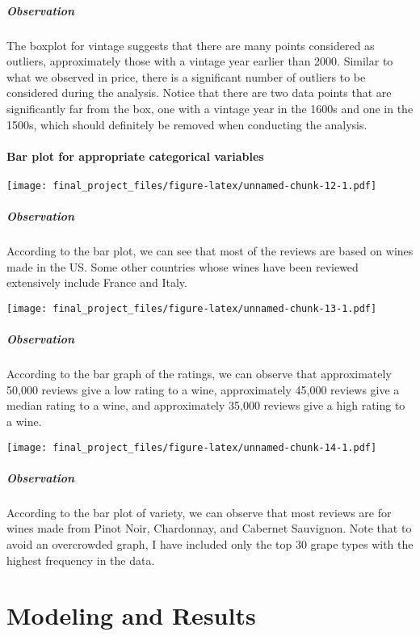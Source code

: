 \documentclass[
]{article}
\begin{document}
\hypertarget{observation-5}{%
\subparagraph{Observation}\label{observation-5}}

The boxplot for vintage suggests that there are many points considered
as outliers, approximately those with a vintage year earlier than 2000.
Similar to what we observed in price, there is a significant number of
outliers to be considered during the analysis. Notice that there are two
data points that are significantly far from the box, one with a vintage
year in the 1600s and one in the 1500s, which should definitely be
removed when conducting the analysis.

\hypertarget{bar-plot-for-appropriate-categorical-variables}{%
\paragraph{Bar plot for appropriate categorical
variables}\label{bar-plot-for-appropriate-categorical-variables}}

\texttt{[image: final\_project\_files/figure-latex/unnamed-chunk-12-1.pdf]}

\hypertarget{observation-6}{%
\subparagraph{Observation}\label{observation-6}}

According to the bar plot, we can see that most of the reviews are based
on wines made in the US. Some other countries whose wines have been
reviewed extensively include France and Italy.

\texttt{[image: final\_project\_files/figure-latex/unnamed-chunk-13-1.pdf]}

\hypertarget{observation-7}{%
\subparagraph{Observation}\label{observation-7}}

According to the bar graph of the ratings, we can observe that
approximately 50,000 reviews give a low rating to a wine, approximately
45,000 reviews give a median rating to a wine, and approximately 35,000
reviews give a high rating to a wine.

\texttt{[image: final\_project\_files/figure-latex/unnamed-chunk-14-1.pdf]}

\hypertarget{observation-8}{%
\subparagraph{Observation}\label{observation-8}}

According to the bar plot of variety, we can observe that most reviews
are for wines made from Pinot Noir, Chardonnay, and Cabernet Sauvignon.
Note that to avoid an overcrowded graph, I have included only the top 30
grape types with the highest frequency in the data.

\hypertarget{modeling-and-results}{%
\section{Modeling and Results}\label{modeling-and-results}}
\end{document}
